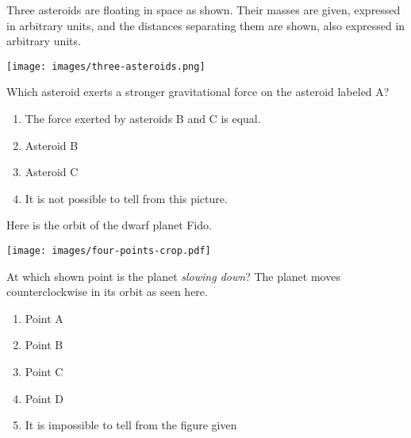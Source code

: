 \documentclass[12pt]{article}
\def\BS{\bigskip}
\newcommand{\BC}{\begin{center}}
\newcommand{\EC}{\end{center}}
\begin{document}
\begin{enumerate}
\vspace{0.5in}

\begin{minipage}{\textwidth}
\item{Three asteroids are floating in space as shown. Their masses are given, expressed in arbitrary units,
and the distances separating them are shown, also expressed in arbitrary units.

\bigskip

\begin{center}
\texttt{[image: images/three-asteroids.png]}
\end{center}

\bigskip

Which asteroid exerts a stronger gravitational force on the asteroid labeled A?

\begin{enumerate}[label=(\Alph*)]
\setlength\itemsep{0.0em}
\item{ The force exerted by asteroids B and C is equal. }
\item{ Asteroid B }
\item{ Asteroid C }
\item{ It is not possible to tell from this picture. }
\end{enumerate}
} %
\end{minipage}


\vspace{0.5in}

\begin{minipage}{\textwidth}
\item{Here is the orbit of the dwarf planet Fido.

\BS
\BC
\texttt{[image: images/four-points-crop.pdf]}
\EC
\BS

At which shown point is the planet {\it slowing down}? The planet moves counterclockwise in its orbit as seen here. 

\begin{enumerate}[label=(\Alph*)]
\setlength\itemsep{0.0em}
\item{ Point A }
\item{ Point B }
\item{ Point C }
\item{ Point D }
\item{ It is impossible to tell from the figure given }
\end{enumerate}
} %
\end{minipage}



\end{enumerate}
\end{document}
